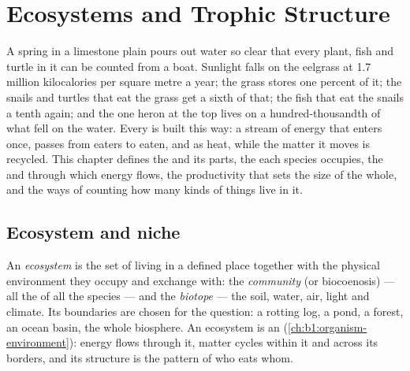 \chapter{Ecosystems and Trophic Structure}\label{ch:b1:ecosystem-organization}

A spring in a limestone plain pours out water so clear that every
plant, fish and turtle in it can be counted from a boat. Sunlight
falls on the eelgrass at \qty{1.7}{} million kilocalories per square
metre a year; the grass stores one percent of it; the snails and
turtles that eat the grass get a sixth of that; the fish that eat the
snails a tenth again; and the one heron at the top lives on a
hundred-thousandth of what fell on the water. Every  is
built this way: a stream of energy that enters once, passes from
eaters to eaten, and  as heat, while the matter it moves is
recycled. This chapter defines the  and its parts, the 
each species occupies, the  and  through which
energy flows, the productivity that sets the size of the whole, and
the ways of counting how many kinds of things live in it.

\section{Ecosystem and niche}

\begin{definition}\label{def:b1:ecosystem-organization:ecosystem}
An \emph{ecosystem} is the set of  living in a defined place
together with the physical environment they occupy and exchange with:
the \emph{community} (or biocoenosis) --- all the  of all
the species --- and the \emph{biotope} --- the soil, water, air, light
and climate. Its boundaries are chosen for the question: a rotting
log, a pond, a forest, an ocean basin, the whole biosphere. An
ecosystem is an  (\cref{ch:b1:organism-environment}): energy
flows through it, matter cycles within it and across its borders, and
its structure is the pattern of who eats whom.
\end{definition}

